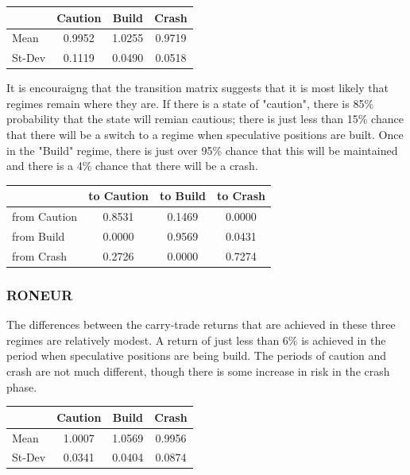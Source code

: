 \documentclass[12pt, a4paper, oneside]{article} %
\begin{document}
\begin{centering}
 \begin{tabular}{l c c c}
 & Caution & Build & Crash \\
 \hline
 Mean & 0.9952 & 1.0255 & 0.9719\\
 St-Dev & 0.1119 & 0.0490 & 0.0518\\
 \end{tabular}
 \end{centering}

It is encouraigng that the transition matrix suggests that it is most likely that regimes remain where they are.  If there is a state of "caution", there is 85\% probability that the state will remian cautious; there is just less than 15\% chance that there will be a switch to a regime when speculative positions are built.  Once in the "Build" regime, there is just over 95\% chance that this will be maintained and there is a 4\% chance that there will be a crash.  

 \begin{centering}
 \begin{tabular}{l c c c}
 & to Caution & to Build & to Crash\\
 \hline
 from Caution & 0.8531 & 0.1469 & 0.0000\\
 from Build & 0.0000 & 0.9569 & 0.0431\\
 from Crash & 0.2726 & 0.0000 & 0.7274
 \end{tabular}
 \end{centering}
 
\subsubsection{RONEUR}
The differences between the carry-trade returns that are achieved in these three regimes are relatively modest.  A return of just less than 6\% is achieved in the period when speculative positions are being build.  The periods of caution and crash are not much different, though there is some increase in risk in the crash phase. 

\begin{centering}
 \begin{tabular}{l c c c}
 & Caution & Build & Crash \\
 \hline
 Mean & 1.0007 & 1.0569 & 0.9956\\
 St-Dev & 0.0341 & 0.0404 & 0.0874\\
 \end{tabular}
 \end{centering}
\end{document}
